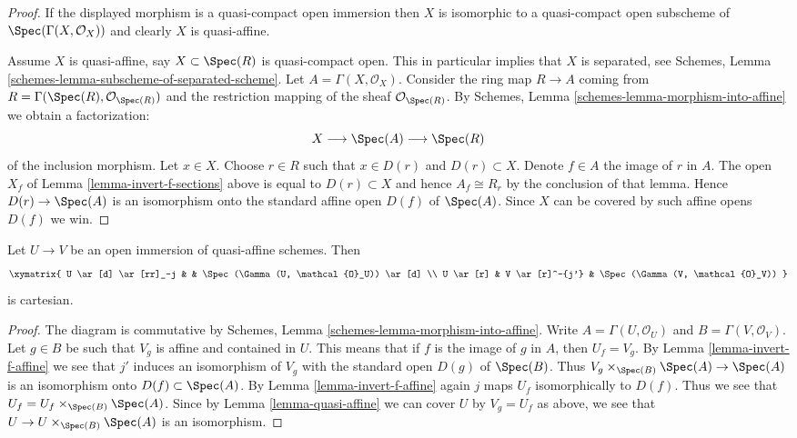 \begin{proof}
If the displayed morphism is a quasi-compact open immersion then
$X$ is isomorphic to a quasi-compact open subscheme of
$\Spec(\Gamma(X, \mathcal{O}_X))$ and clearly $X$ is quasi-affine.

\medskip\noindent
Assume $X$ is quasi-affine, say $X \subset \Spec(R)$ is
quasi-compact open. This in particular implies that $X$ is
separated, see
Schemes, Lemma \ref{schemes-lemma-subscheme-of-separated-scheme}.
Let $A = \Gamma(X, \mathcal{O}_X)$.
Consider the ring map $R \to A$ coming from
$R = \Gamma(\Spec(R), \mathcal{O}_{\Spec(R)})$
and the restriction mapping of the sheaf $\mathcal{O}_{\Spec(R)}$.
By Schemes, Lemma \ref{schemes-lemma-morphism-into-affine}
we obtain a factorization:
$$
X \longrightarrow
\Spec(A) \longrightarrow
\Spec(R)
$$
of the inclusion morphism. Let $x \in X$. Choose $r \in R$ such that
$x \in D(r)$ and $D(r) \subset X$. Denote $f \in A$ the image of $r$
in $A$. The open $X_f$ of Lemma \ref{lemma-invert-f-sections}
above is equal to $D(r) \subset X$ and hence $A_f \cong R_r$ by the
conclusion of that lemma.
Hence $D(r) \to \Spec(A)$ is an isomorphism onto the
standard affine open $D(f)$ of $\Spec(A)$. Since $X$
can be covered by such affine opens $D(f)$ we win.
\end{proof}

\begin{lemma}
\label{lemma-cartesian-diagram-quasi-affine}
Let $U \to V$ be an open immersion of quasi-affine schemes. Then
$$
\xymatrix{
U \ar[d] \ar[rr]_-j & & \Spec(\Gamma(U, \mathcal{O}_U)) \ar[d] \\
U \ar[r] & V \ar[r]^-{j'} & \Spec(\Gamma(V, \mathcal{O}_V))
}
$$
is cartesian.
\end{lemma}

\begin{proof}
The diagram is commutative by Schemes, Lemma
\ref{schemes-lemma-morphism-into-affine}.
Write $A = \Gamma(U, \mathcal{O}_U)$ and $B = \Gamma(V, \mathcal{O}_V)$. Let
$g \in B$ be such that $V_g$ is affine and contained in $U$. This
means that if $f$ is the image of $g$ in $A$, then $U_f = V_g$. By Lemma
\ref{lemma-invert-f-affine} we see that $j'$ induces an isomorphism of
$V_g$ with the standard open $D(g)$ of $\Spec(B)$. Thus
$V_g \times_{\Spec(B)} \Spec(A) \to \Spec(A)$ is an
isomorphism onto $D(f) \subset \Spec(A)$. By Lemma \ref{lemma-invert-f-affine}
again $j$ maps $U_f$ isomorphically to $D(f)$. Thus we see that
$U_f = U_f \times_{\Spec(B)} \Spec(A)$. Since by
Lemma \ref{lemma-quasi-affine} we can cover $U$ by $V_g = U_f$ as above,
we see that $U \to U \times_{\Spec(B)} \Spec(A)$ is an isomorphism.
\end{proof}

